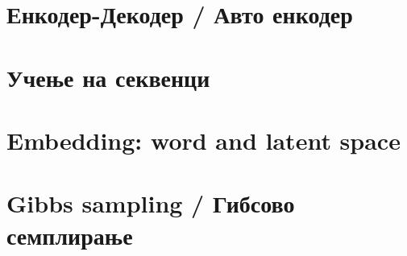 \section{Енкодер-Декодер / Авто енкодер}

\section{Учење на секвенци}

\section{Embedding: word and latent space}

\section{Gibbs sampling / Гибсово семплирање}

